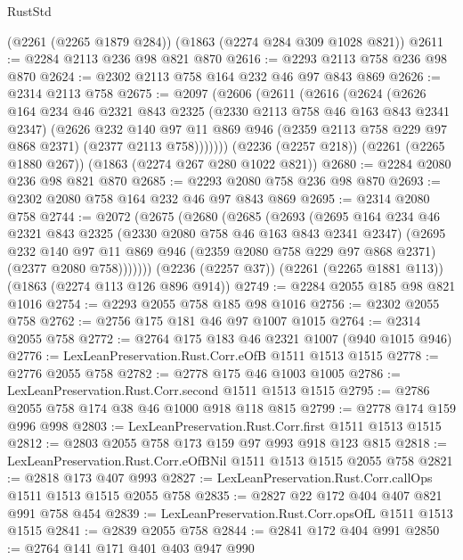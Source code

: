 \begin{lexlean}{RustStd}
\begin{coremodule}
    (@2261 (@2265 @1879 @284))
    (@1863 (@2274 @284 @309 @1028 @821))
@2611 := @2284 @2113 @236 @98 @821 @870
@2616 := @2293 @2113 @758 @236 @98 @870
@2624 := @2302 @2113 @758 @164 @232 @46 @97 @843 @869
@2626 := @2314 @2113 @758
@2675 := @2097
    (@2606
      (@2611
        (@2616
          (@2624
            (@2626
              @164
              @234
              @46
              @2321
              @843
              @2325
              (@2330 @2113 @758 @46 @163 @843 @2341 @2347)
              (@2626
                @232
                @140
                @97
                @11
                @869
                @946
                (@2359 @2113 @758 @229 @97 @868 @2371)
                (@2377 @2113 @758)))))))
    (@2236 (@2257 @218))
    (@2261 (@2265 @1880 @267))
    (@1863 (@2274 @267 @280 @1022 @821))
@2680 := @2284 @2080 @236 @98 @821 @870
@2685 := @2293 @2080 @758 @236 @98 @870
@2693 := @2302 @2080 @758 @164 @232 @46 @97 @843 @869
@2695 := @2314 @2080 @758
@2744 := @2072
    (@2675
      (@2680
        (@2685
          (@2693
            (@2695
              @164
              @234
              @46
              @2321
              @843
              @2325
              (@2330 @2080 @758 @46 @163 @843 @2341 @2347)
              (@2695
                @232
                @140
                @97
                @11
                @869
                @946
                (@2359 @2080 @758 @229 @97 @868 @2371)
                (@2377 @2080 @758)))))))
    (@2236 (@2257 @37))
    (@2261 (@2265 @1881 @113))
    (@1863 (@2274 @113 @126 @896 @914))
@2749 := @2284 @2055 @185 @98 @821 @1016
@2754 := @2293 @2055 @758 @185 @98 @1016
@2756 := @2302 @2055 @758
@2762 := @2756 @175 @181 @46 @97 @1007 @1015
@2764 := @2314 @2055 @758
@2772 := @2764 @175 @183 @46 @2321 @1007 (@940 @1015 @946)
@2776 := LexLeanPreservation.Rust.Corr.eOfB @1511 @1513 @1515
@2778 := @2776 @2055 @758
@2782 := @2778 @175 @46 @1003 @1005
@2786 := LexLeanPreservation.Rust.Corr.second @1511 @1513 @1515
@2795 := @2786 @2055 @758 @174 @38 @46 @1000 @918 @118 @815
@2799 := @2778 @174 @159 @996 @998
@2803 := LexLeanPreservation.Rust.Corr.first @1511 @1513 @1515
@2812 := @2803 @2055 @758 @173 @159 @97 @993 @918 @123 @815
@2818 := LexLeanPreservation.Rust.Corr.eOfBNil @1511 @1513 @1515 @2055 @758
@2821 := @2818 @173 @407 @993
@2827 := LexLeanPreservation.Rust.Corr.callOps @1511 @1513 @1515 @2055 @758
@2835 := @2827 @22 @172 @404 @407 @821 @991 @758 @454
@2839 := LexLeanPreservation.Rust.Corr.opsOfL @1511 @1513 @1515
@2841 := @2839 @2055 @758
@2844 := @2841 @172 @404 @991
@2850 := @2764 @141 @171 @401 @403 @947 @990

\end{coremodule}
\end{lexlean}
